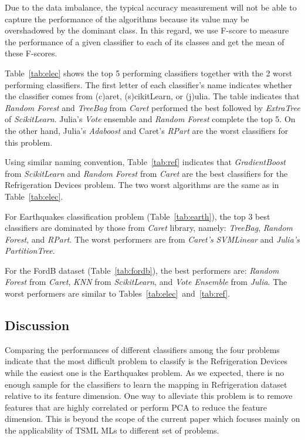 \documentclass{juliacon}
\begin{document}
Due to the data imbalance, the typical accuracy measurement will not be able to capture the performance of the algorithms because its value may be overshadowed by the dominant class. In this regard, we use F-score to measure the performance of a given classifier to each of its classes and get the mean of these F-scores.

\vskip 6pt

Table~\ref{tab:elec} shows the top 5 performing classifiers together with the 2 worst performing classifiers. The first letter of each classifier's name indicates whether the classifier comes from (c)aret, (s)cikitLearn, or (j)ulia. The table indicates that \emph{Random Forest} and \emph{TreeBag} from \emph{Caret} performed the best followed by \emph{ExtraTree} of \emph{ScikitLearn}. Julia's \emph{Vote} ensemble and \emph{Random Forest} complete the top 5. On the other hand, Julia's \emph{Adaboost} and Caret's \emph{RPart} are the worst classifiers for this problem.  

\vskip 6pt

Using similar naming convention, Table~\ref{tab:ref} indicates that \emph{GradientBoost} from \emph{ScikitLearn} and \emph{Random Forest} from \emph{Caret} are the best classifiers for the Refrigeration Devices problem. The two worst algorithms are the same as in Table~\ref{tab:elec}.

\vskip 6pt

For Earthquakes classification problem (Table~\ref{tab:earth}), the top 3 best classifiers are dominated by those from \emph{Caret} library, namely: \emph{TreeBag}, \emph{Random Forest}, and \emph{RPart}. The worst performers are from \emph{Caret's} \emph{SVMLinear} and \emph{Julia's} \emph{PartitionTree}.

\vskip 6pt

For the FordB dataset (Table~\ref{tab:fordb}), the best performers are: \emph{Random Forest} from \emph{Caret}, \emph{KNN} from \emph{ScikitLearn}, and \emph{Vote Ensemble} from \emph{Julia}. The worst performers are similar to Tables~\ref{tab:elec}~and~\ref{tab:ref}.

\subsection{Discussion}
Comparing the performances of different classifiers among the four problems indicate that the most difficult problem to classify is the Refrigeration Devices while the easiest one is the Earthquakes problem. As we expected, there is no enough sample for the classifiers to learn the mapping in Refrigeration dataset relative to its feature dimension. One way to alleviate this problem is to remove features that are highly correlated or perform PCA to reduce the feature dimension. This is beyond the scope of the current paper which focuses mainly on the applicability of TSML MLs to different set of problems. 
\end{document}
